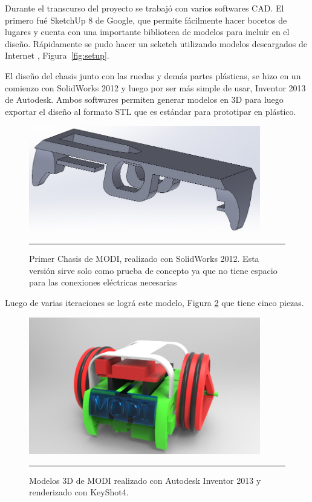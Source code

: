 Durante el transcurso del proyecto se trabajó con varios softwares CAD. El primero fué SketchUp 8 de Google, que permite fácilmente hacer bocetos de lugares y cuenta con una importante biblioteca de modelos para incluir en el diseño. Rápidamente se pudo hacer un scketch utilizando modelos descargados de Internet , Figura~\ref{fig:setup}.

El diseño del chasis junto con las ruedas y demás partes plásticas, se hizo en un comienzo con SolidWorks 2012 y luego por ser más simple de usar, Inventor 2013 de Autodesk. Ambos softwares permiten generar modelos en 3D para luego exportar el diseño al formato STL que es estándar para prototipar en plástico.


\begin{figure}[htbp]
	\centering
		\includegraphics[width=0.9\textwidth]{./Figures/MODI/1MODI.jpg}
		\rule{35em}{0.5pt}
	\caption[ModiSolidWorks]{Primer Chasis de MODI, realizado con SolidWorks 2012. Esta versión sirve solo como prueba de concepto ya que no tiene espacio para las conexiones eléctricas necesarias}
	\label{fig:MODISolidWork}
\end{figure}	

Luego de varias iteraciones se lográ este modelo, Figura \ref{fig:render3} que tiene cinco piezas. 


\begin{figure}[htbp]
	\centering
		\includegraphics[width=0.9\textwidth]{./Figures/MODI/render3.jpg}
		\rule{35em}{0.5pt}
	\caption[Render modi]{Modelos 3D de MODI realizado con Autodesk Inventor 2013 y renderizado con KeyShot4. }
	\label{fig:render3}
\end{figure}	


